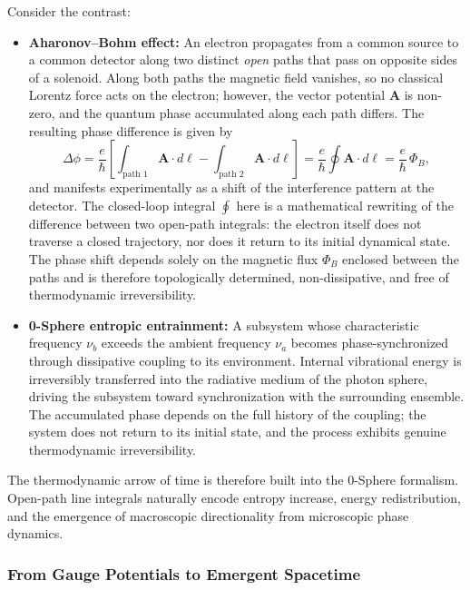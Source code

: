 \documentclass[12pt,letterpaper]{article}
\begin{document}
Consider the contrast:
\begin{itemize}
\item \textbf{Aharonov--Bohm effect:}
An electron propagates from a common source to a common detector along two distinct \emph{open} paths that pass on opposite sides of a solenoid. Along both paths the magnetic field vanishes, so no classical Lorentz force acts on the electron; however, the vector potential $\bm{A}$ is non-zero, and the quantum phase accumulated along each path differs. The resulting phase difference is given by
\[
  \Delta\phi
  = \frac{e}{\hbar}
    \left[
      \int_{\text{path 1}} \bm{A}\cdot d\bm{\ell}
      -
      \int_{\text{path 2}} \bm{A}\cdot d\bm{\ell}
    \right]
  = \frac{e}{\hbar}\oint \bm{A}\cdot d\bm{\ell}
  = \frac{e}{\hbar}\,\Phi_B,
\]
and manifests experimentally as a shift of the interference pattern at the detector. The closed-loop
integral $\oint$ here is a mathematical rewriting of the difference between two open-path integrals: the electron itself does not traverse a closed trajectory, nor does it return to its initial dynamical state. The phase shift depends solely on the magnetic flux $\Phi_B$ enclosed between the paths and is therefore topologically determined, non-dissipative, and free of thermodynamic irreversibility.


\item \textbf{0-Sphere entropic entrainment:}
A subsystem whose characteristic frequency $\nu_b$ exceeds the ambient frequency $\nu_a$ becomes phase-synchronized through dissipative coupling to its environment. Internal vibrational energy is irreversibly transferred into the radiative medium of the photon sphere, driving the subsystem toward synchronization with the surrounding
ensemble. The accumulated phase depends on the full history of the coupling; the system does not return to its initial state, and the process exhibits genuine thermodynamic irreversibility.
\end{itemize}

The thermodynamic arrow of time is therefore built into the 0-Sphere formalism. Open-path line integrals naturally encode entropy increase, energy redistribution, and the emergence of macroscopic directionality from microscopic phase dynamics.


\subsubsection{From Gauge Potentials to Emergent Spacetime}
\label{subsubsec:emergent_spacetime}
\end{document}
